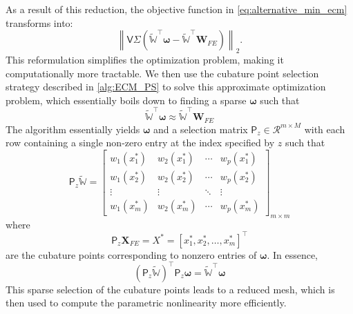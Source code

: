 \documentclass[11pt]{article}
\renewcommand{\vec}[1]{\mathbf{#1}}
\newcommand{\mat}[1]{\mathsf{#1}}
\begin{document}
            As a result of this reduction, the objective function in \cref{eq:alternative_min_ecm} transforms into:
            \begin{equation}
            \left\| \mat{V} \mat{\Sigma} \left( \widetilde{\mathbb{W}}^{\top} \boldsymbol{\omega} - \widetilde{\mathbb{W}}^{\top} \vec{W}_{FE} \right) \right\|_2.
            \label{eq:ecm_opt2_a}
            \end{equation}
            This reformulation simplifies the optimization problem, making it  computationally more tractable.
            We then use the cubature point selection strategy described in \cref{alg:ECM_PS} to solve this approximate optimization problem, which essentially boils down to finding  a sparse $\boldsymbol{\omega}$ such that
            \begin{equation}
            \widetilde{\mathbb{W}}^{\top} \boldsymbol{\omega} \approx \widetilde{\mathbb{W}}^{\top} \vec{W}_{FE}
            \label{eq:ecm_opt3}
            \end{equation}
            The algorithm essentially yields $\boldsymbol{\omega}$ and a selection matrix $\mat{P}_z\in \mathcal{R}^{m\times M}$ with each row containing a single non-zero entry at the index specified by $z$ such that
            \begin{equation}
            \mat{P}_z \mathbb{\widetilde{W}} =
            \begin{bmatrix}
                w_1(x_1^*) & w_2(x_1^*) & \cdots & w_p(x_1^*) \\
                w_1(x_2^*) & w_2(x_2^*) & \cdots & w_p(x_2^*) \\
                \vdots & \vdots & \ddots & \vdots \\
                w_1(x_m^*) & w_2(x_m^*) & \cdots & w_p(x_m^*)
            \end{bmatrix}_{m \times m}
            \end{equation}
            where
            \begin{equation}
            \mat{P}_z \vec{X}_{FE} = X^* = [x_1^*, x_2^*, \ldots, x_m^*]^{\top}
            \end{equation}
            are the cubature points corresponding to nonzero entries of $\boldsymbol\omega$.
            In essence,
            \begin{equation}
            (\mat{P}_z\widetilde{\mathbb{W}})^{\top} \mat{P}_z\boldsymbol{\omega} = \widetilde{\mathbb{W}}^{\top} \boldsymbol\omega
            \end{equation}
            This sparse selection of the cubature points leads to a reduced mesh, which is then used to compute the parametric nonlinearity more efficiently.
\end{document}

